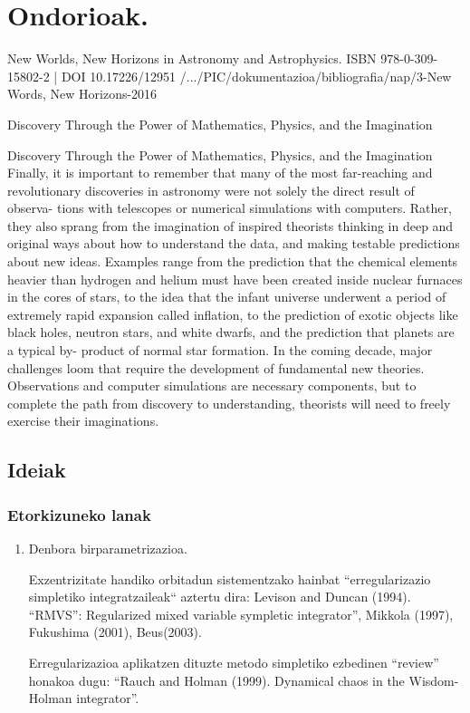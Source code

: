 \chapter{Ondorioak.}


New Worlds, New Horizons in Astronomy and Astrophysics.
ISBN 978-0-309-15802-2 | DOI 10.17226/12951
/.../PIC/dokumentazioa/bibliografia/nap/3-New Words, New Horizons-2016


Discovery Through the Power of Mathematics, Physics, and the Imagination


Discovery Through the Power of Mathematics, Physics, and the Imagination
Finally, it is important to remember that many of the most far-reaching and
revolutionary discoveries in astronomy were not solely the direct result of observa-
tions with telescopes or numerical simulations with computers. Rather, they also
sprang from the imagination of inspired theorists thinking in deep and original
ways about how to understand the data, and making testable predictions about
new ideas. Examples range from the prediction that the chemical elements heavier
than hydrogen and helium must have been created inside nuclear furnaces in the
cores of stars, to the idea that the infant universe underwent a period of extremely
rapid expansion called inflation, to the prediction of exotic objects like black holes,
neutron stars, and white dwarfs, and the prediction that planets are a typical by-
product of normal star formation.
In the coming decade, major challenges loom that require the development of
fundamental new theories. Observations and computer simulations are necessary
components, but to complete the path from discovery to understanding, theorists
will need to freely exercise their imaginations.

\section{Ideiak}

\subsection*{Etorkizuneko lanak}

\begin{enumerate}
\item Denbora birparametrizazioa.

Exzentrizitate handiko orbitadun sistementzako hainbat “erregularizazio simpletiko integratzaileak“ aztertu dira:
Levison and Duncan (1994). “RMVS”: Regularized mixed variable sympletic integrator”, Mikkola (1997), Fukushima (2001), Beus(2003).

Erregularizazioa aplikatzen dituzte metodo simpletiko ezbedinen “review” honakoa dugu: “Rauch
and Holman (1999). Dynamical chaos in the Wisdom-Holman integrator”.

\end{enumerate}
